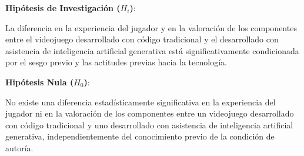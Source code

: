 \textbf{Hipótesis de Investigación ($H_i$)}:

La diferencia en la experiencia del jugador y en la valoración de los componentes entre el videojuego desarrollado con código tradicional y el desarrollado con asistencia de inteligencia artificial generativa está significativamente condicionada por el sesgo previo y las actitudes previas hacia la tecnología.

\textbf{Hipótesis Nula ($H_0$)}:

No existe una diferencia estadísticamente significativa en la experiencia del jugador ni en la valoración de los componentes entre un videojuego desarrollado con código tradicional y uno desarrollado con asistencia de inteligencia artificial generativa, independientemente del conocimiento previo de la condición de autoría.
